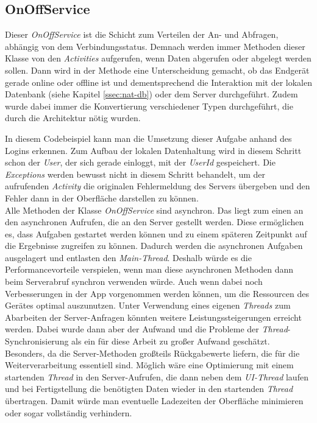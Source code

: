 \subsection{OnOffService}
\label{ssec:nat-onoffservice}
Dieser \textit{OnOffService} ist die Schicht zum Verteilen der An- und Abfragen, abhängig von dem Verbindungsstatus. Demnach werden immer Methoden dieser Klasse von den \textit{Activities} aufgerufen, wenn Daten abgerufen oder abgelegt werden sollen. Dann wird in der Methode eine Unterscheidung gemacht, ob das Endgerät gerade online oder offline ist und dementsprechend die Interaktion mit der lokalen Datenbank (siehe Kapitel \ref{ssec:nat-db}) oder dem Server durchgeführt. Zudem wurde dabei immer die Konvertierung verschiedener Typen durchgeführt, die durch die Architektur nötig wurden.

In diesem Codebeispiel kann man die Umsetzung dieser Aufgabe anhand des Logins erkennen. Zum Aufbau der lokalen Datenhaltung wird in diesem Schritt schon der \textit{User}, der sich gerade einloggt, mit der \textit{UserId} gespeichert. Die \textit{Exceptions} werden bewusst nicht in diesem Schritt behandelt, um der aufrufenden \textit{Activity} die originalen Fehlermeldung des Servers übergeben und den Fehler dann in der Oberfläche darstellen zu können.\\
Alle Methoden der Klasse \textit{OnOffService} sind asynchron. Das liegt zum einen an den asynchronen Aufrufen, die an den Server gestellt werden. Diese ermöglichen es, dass Aufgaben gestartet werden können und zu einem späteren Zeitpunkt auf die Ergebnisse zugreifen zu können. Dadurch werden die asynchronen Aufgaben ausgelagert und entlasten den \textit{Main-Thread}. Deshalb würde es die Performancevorteile verspielen, wenn man diese asynchronen Methoden dann beim Serverabruf synchron verwenden würde. Auch wenn dabei noch Verbesserungen in der App vorgenommen werden können, um die Ressourcen des Gerätes optimal auszunutzen. Unter Verwendung eines eigenen \textit{Threads} zum Abarbeiten der Server-Anfragen könnten weitere Leistungssteigerungen erreicht werden. Dabei wurde dann aber der Aufwand und die Probleme der \textit{Thread}-Synchronisierung als ein für diese Arbeit zu großer Aufwand geschätzt. Besonders, da die Server-Methoden großteils Rückgabewerte liefern, die für die Weiterverarbeitung essentiell sind. Möglich wäre eine Optimierung mit einem startenden \textit{Thread} in den Server-Aufrufen, die dann neben dem \textit{UI-Thread} laufen und bei Fertigstellung die benötigten Daten wieder in den startenden \textit{Thread} übertragen. Damit würde man eventuelle Ladezeiten der Oberfläche minimieren oder sogar vollständig verhindern.


